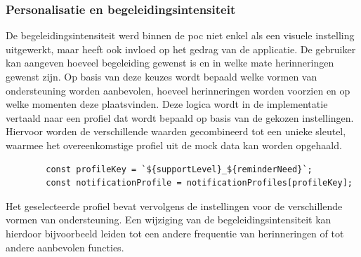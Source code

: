 \subsubsection{Personalisatie en begeleidingsintensiteit}
\label{sec:personalisatie-code}

\vspace{1em}

De begeleidingsintensiteit werd binnen de \acrshort{poc} niet enkel als een visuele instelling uitgewerkt, maar heeft ook invloed op het gedrag van de applicatie. De gebruiker kan aangeven hoeveel begeleiding gewenst is en in welke mate herinneringen gewenst zijn. Op basis van deze keuzes wordt bepaald welke vormen van ondersteuning worden aanbevolen, hoeveel herinneringen worden voorzien en op welke momenten deze plaatsvinden. Deze logica wordt in de implementatie vertaald naar een profiel dat wordt bepaald op basis van de gekozen instellingen. Hiervoor worden de verschillende waarden gecombineerd tot een unieke sleutel, waarmee het overeenkomstige profiel uit de mock data kan worden opgehaald.

\vspace{1em}

\begin{listing}[H]
    \begin{verbatim}
        const profileKey = `${supportLevel}_${reminderNeed}`;
        const notificationProfile = notificationProfiles[profileKey];
    \end{verbatim}
    \caption[Selecteren van een personalisatieprofiel]
    {Selecteren van het personalisatieprofiel op basis van gebruikersvoorkeuren.}
    \label{lst:profile-selection}
\end{listing}

\vspace{1em}

Het geselecteerde profiel bevat vervolgens de instellingen voor de verschillende vormen van ondersteuning. Een wijziging van de begeleidingsintensiteit kan hierdoor bijvoorbeeld leiden tot een andere frequentie van herinneringen of tot andere aanbevolen functies.

\vspace{1em}

